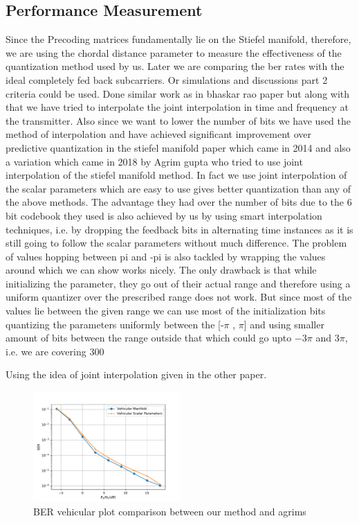 \documentclass[conference]{IEEEtran}
\begin{document}
\subsection{Performance Measurement}
\label{setting}

\noindent Since the Precoding matrices fundamentally lie on the Stiefel manifold, therefore, we are using the chordal distance parameter to measure the effectiveness of the quantization method used by us. Later we are comparing the ber rates with the ideal completely fed back subcarriers. Or simulations and discussions part 2 criteria could be used. Done similar work as in bhaskar rao paper but along with that we have tried to interpolate the joint interpolation in time and frequency at the transmitter. Also since we want to lower the number of bits we have used the method of interpolation and have achieved significant improvement over predictive quantization in the stiefel manifold paper which came in 2014 and also a variation which came in 2018 by Agrim gupta who tried to use joint interpolation of the stiefel manifold method. In fact we use joint interpolation of the scalar parameters which are easy to use gives better quantization than any of the above methods.
The advantage they had over the number of bits due to the 6 bit codebook they used is also achieved by us by using smart interpolation techniques, i.e. by dropping the feedback bits in alternating time instances as it is still going to follow the scalar parameters without much difference.
The problem of values hopping between pi and -pi is also tackled by wrapping the values around which we can show works nicely. The only drawback is that while initializing the parameter, they go out of their actual range and therefore using a uniform quantizer over the prescribed range does not work. But since most of the values lie between the given range we can use most of the initialization bits quantizing the parameters uniformly between the [-$\pi$ , $\pi$] and using smaller amount of bits between the range outside that which could go upto $-3\pi$ and $3\pi$, i.e. we are covering 300%

Using the idea of joint interpolation given in the other paper.
\begin{figure}
\includegraphics[width=0.5\textwidth]{images/vehicular_ber.pdf}

\caption{BER vehicular plot comparison between our method and agrims}
\label{ber_overview}
\vspace{-5pt}
\end{figure}
\end{document}
